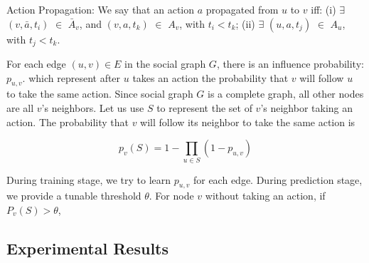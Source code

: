\begin{definition}{Action Propagation:}
We say that an action $a$ propagated from $u$ to $v$ iff: (i) $\exists$ $(v, \bar{a}, t_i)$ $\in$ $\bar{A}_v$, 
and $(v, a, t_k)$ $\in$ $A_v$, with $t_i < t_k$; (ii) $\exists$ $(u, a, t_j)$ $\in$ $A_u$, with $t_j < t_k$. 
\end{definition}

For each edge $(u, v) \in E$ in the social graph $G$, 
there is an influence probability: $p_{u,v}$. 
which represent after $u$ takes an action the probability that $v$ will follow $u$ to take the same action. 
Since social graph $G$ is a complete graph, 
all other nodes are all $v$’s neighbors. Let us use $S$ to represent the set of $v$’s neighbor taking an action. 
The probability that $v$ will follow its neighbor to take the same action is

$$p_v(S) = 1 - \prod\limits_{u \in S}(1 - p_{u,v})$$

During training stage, we try to learn $p_{u,v}$ for each edge. 
During prediction stage, we provide a tunable threshold $\theta$. 
For node $v$ without taking an action, 
if $P_v(S)>\theta$, 



\subsection{Experimental Results}